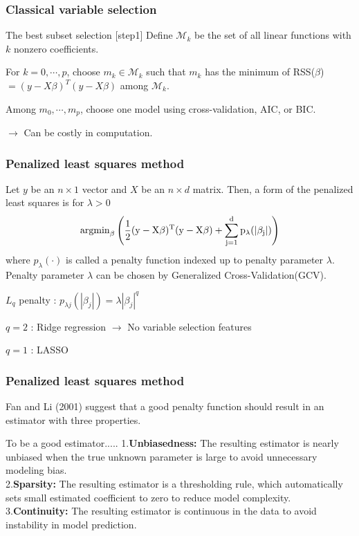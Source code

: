 \documentclass{beamer}
\begin{document}
\begin{frame}
\frametitle{Classical variable selection}

\begin{block}{ The best subset selection}
[step1] Define $\mathcal{M}_k$ be the set of all linear functions with $k$ nonzero coefficients. 

\noindent [step2] For $k=0, \cdots , p$, choose $m_k \in \mathcal{M}_k$ such that $m_k$ has the minimum of  RSS($\beta$) $=  (y - X \beta)^T (y - X \beta)$ among $\mathcal{M}_k$.

\noindent [step3] Among $m_0, \cdots, m_p$, choose one model using cross-validation, AIC, or BIC.
\end{block}
$\to$ Can be costly in computation. 
\end{frame}
\begin{frame}
\frametitle{Penalized least squares method}
Let $y$ be an $n \times 1 $ vector and $ X$ be an $n \times d$ matrix. Then, a form of the penalized least squares is for $\lambda >0$ 
$$\rm{argmin}_{\beta}  \left( \frac{1}{2} (y - X \beta)^T (y - X \beta) +  \sum_{j=1} ^d p_\lambda ( |\beta_j| ) \right)$$
where $ p_\lambda ( \cdot ) $ is called a penalty function indexed up to penalty parameter $\lambda$. Penalty parameter $\lambda$ can be chosen by Generalized Cross-Validation(GCV).\\ \vspace{0.2in}

$L_q$ penalty : $ p_{\lambda j} (|\beta_j|) = \lambda |\beta_j| ^q $

$q=2$ : Ridge regression $\to$ No variable selection features

$q=1$ : LASSO
\end{frame}
\begin{frame}
\frametitle{Penalized least squares method}
Fan and Li (2001) suggest that a good penalty function should result in an estimator with three properties.
\begin{block}{To be a good estimator.....}
1.\textbf{Unbiasedness:} The resulting estimator is nearly unbiased when the true unknown parameter is large to avoid unnecessary modeling bias.\\
2.\textbf{Sparsity:} The resulting estimator is a thresholding rule, which automatically sets small estimated coefficient to zero to reduce model complexity.\\
3.\textbf{Continuity:} The resulting estimator is continuous in the data to avoid instability in model prediction.
\end{block}
\end{frame}
\end{document}
